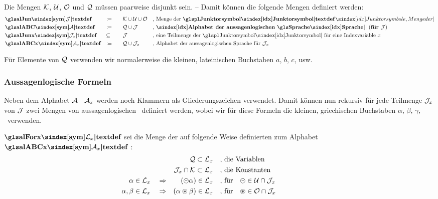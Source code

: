 Die Mengen $\mathcal{K}$, $\mathcal{U}$, $\mathcal{O}$ und $\mathcal{Q}$ müssen paarweise disjunkt sein.
-- Damit können die folgende Mengen definiert werden:
\begin{align}
	& \definition{\symalJun}  & \defeq      \qquad & \alCon \cup \alUna \cup \alBin
	&& \text{, Menge der \definition{\Junktorsymbole}}
	\idx{Junktorsymbole, Menge der} \label{def:alJun}
	\\
	& \definition{\symalABC}  & \defeq      \qquad & \alVar \cup \alJun
	&& \text{, \defn{\idx{Alphabet der aussagenlogischen \Sprache}}
	(\defn{für} $\alJun$)}          \label{def:alABC}
	\\
	& \definition{\symalJunx} & \subseteq\; \qquad & \alJun
	&& \text{, eine Teilmenge der \Junktorsymbole\ für eine Indexvariable $x$}
	~                               \label{def:alJunx}
	\\
	& \definition{\symalABCx} & \defeq      \qquad & \alVar \cup \alJun_x \quad
	&& \text{, Alphabet der aussagenlogischen Sprache
	für $\alJun_x$}                 \label{def:alABCx}
\end{align}

Für Elemente von $\mathcal{Q}$ verwenden wir normalerweise die kleinen, lateinischen Buchstaben $a$, $b$, $c$, usw.

\subsubsection{Aussagenlogische Formeln}%
\label{subsub:Formeln}

Neben dem Alphabet $\mathcal{A}$ \textbzw\ $\mathcal{A}_x$ werden noch Klammern als Gliederungszeichen verwendet.
Damit können nun rekursiv für jede Teilmenge $\mathcal{J}_x$ von $\mathcal{J}$ zwei Mengen von aussagenlogischen \Formeln\ definiert werden, wobei wir für diese Formeln die kleinen, griechischen Buchstaben $\alpha$, $\beta$, $\gamma$, \textusw\ verwenden.

$\definition{\symalForx}$ sei die Menge der auf folgende Weise definierten   zum Alphabet $\definition{\symalABCx}$%
:
\begin{align}
	&                                & \mathcal{Q}               \subset \mathcal{L}_x
	&&& \text{, die Variablen}  \label{def:ForQ}  \\
	&                                & \mathcal{J}_x \cap \mathcal{K} \subset \mathcal{L}_x
	&&& \text{, die Konstanten} \label{def:ForJK} \\
	\alpha      \in\mathcal{L}_x & \quad\Rightarrow &     (\mathbin{\circleddash}\alpha)\in\mathcal{L}_x
	&&& \text{, für} \quad \mathbin{\circleddash} \in \mathcal{U} \cap \mathcal{J}_x
	\label{def:ForU} \\
	\alpha,\beta\in\mathcal{L}_x & \quad\Rightarrow & (\alpha\mathbin{\circledast}\beta)\in\mathcal{L}_x
	&&& \text{, für} \quad \mathbin{\circledast}  \in \mathcal{O} \cap \mathcal{J}_x
	\label{def:ForB} &&&&&&&&&&
\end{align}

